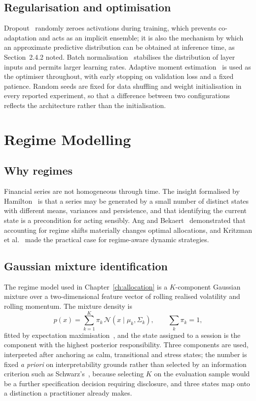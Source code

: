 \subsection{Regularisation and optimisation}

Dropout~\cite{srivastava2014dropout} randomly zeroes activations during training, which prevents
co-adaptation and acts as an implicit ensemble; it is also the mechanism by which an approximate
predictive distribution can be obtained at inference time, as Section~2.4.2 noted. Batch
normalisation~\cite{ioffe2015bn} stabilises the distribution of layer inputs and permits larger
learning rates. Adaptive moment estimation~\cite{kingma2015adam} is used as the optimiser
throughout, with early stopping on validation loss and a fixed patience. Random seeds are fixed
for data shuffling and weight initialisation in every reported experiment, so that a difference
between two configurations reflects the architecture rather than the initialisation.

\section{Regime Modelling}

\subsection{Why regimes}

Financial series are not homogeneous through time. The insight formalised by
Hamilton~\cite{hamilton1989} is that a series may be generated by a small number of distinct
states with different means, variances and persistence, and that identifying the current state
is a precondition for acting sensibly. Ang and Bekaert~\cite{ang2002} demonstrated that
accounting for regime shifts materially changes optimal allocations, and Kritzman et
al.~\cite{kritzman2012} made the practical case for regime-aware dynamic strategies.

\subsection{Gaussian mixture identification}

The regime model used in Chapter~\ref{ch:allocation} is a $K$-component Gaussian mixture over a
two-dimensional feature vector of rolling realised volatility and rolling momentum. The mixture
density is
\begin{equation}
p(x) = \sum_{k=1}^{K} \pi_k \,\mathcal{N}\!\left(x \mid \mu_k, \Sigma_k\right),
\qquad \sum_k \pi_k = 1,
\end{equation}
fitted by expectation maximisation~\cite{dempster1977}, and the state assigned to a session is
the component with the highest posterior responsibility. Three components are used, interpreted
after anchoring as calm, transitional and stress states; the number is fixed \emph{a priori} on
interpretability grounds rather than selected by an information criterion such as
Schwarz's~\cite{schwarz1978}, because selecting $K$ on the evaluation sample would be a further
specification decision requiring disclosure, and three states map onto a distinction a
practitioner already makes.

